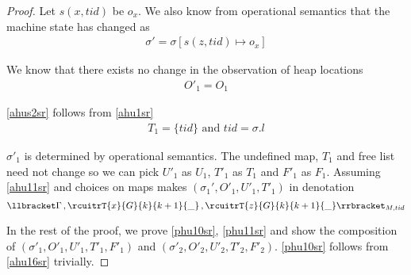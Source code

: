 \begin{proof}
Let $s(x,tid)$ be $o_x$. We also know from operational semantics that the machine state has changed as 
\begin{gather}\label{ahussr}
\sigma' =  \sigma[s(z,tid) \mapsto o_x ]
\end{gather}

We know that there exists no change in the observation of heap locations
\begin{gather}\label{ahus1sr}
O'_1 =  O_1
\end{gather}

\ref{ahus2sr} follows from \ref{ahu1sr}
\begin{gather}\label{ahus2sr}
  T_1 = \{tid\} \text{ and } tid = \sigma.l
\end{gather}

$\sigma'_1$ is determined by operational semantics. The undefined map, $T_1$ and free list need not change so we can pick $U'_1$ as $U_1$, $T'_1$  as $T_1$ and $F'_1$ as $F_1$. Assuming \ref{ahu11sr} and choices on maps makes $(\sigma_1',O'_{1},U'_{1}, T'_{1})$ in denotation
\[\llbracket \Gamma\,, \rcuitrT{x}{G}{k}{k+1}{\_}\, , \rcuitrT{z}{G}{k}{k+1}{\_}  \rrbracket_{M,tid}\]

In the rest of the proof, we prove \ref{phu10sr}, \ref{phu11sr} and show the composition of $(\sigma'_1, O'_1, U'_1,T'_1,F'_1)$ and  $(\sigma'_2, O'_2, U'_2,T'_2,F'_2)$. \ref{phu10sr} follows from \ref{ahu16sr} trivially.


\end{proof}
